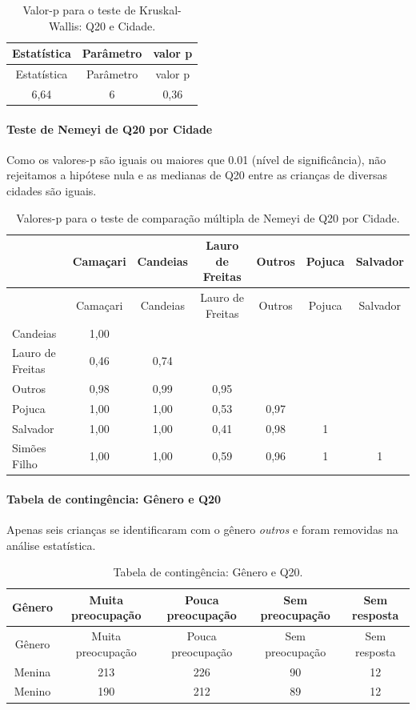 \documentclass[]{article}
\let\oldparagraph\paragraph
\renewcommand{\paragraph}[1]{\oldparagraph{#1}\mbox{}}
\begin{document}
\begin{longtable}[]{@{}ccc@{}}
\caption{\label{tab:unnamed-chunk-374}Valor-p para o teste de Kruskal-Wallis: Q20 e Cidade.}\tabularnewline
\toprule
Estatística & Parâmetro & valor p\tabularnewline
\midrule
\endfirsthead
\toprule
Estatística & Parâmetro & valor p\tabularnewline
\midrule
\endhead
6,64 & 6 & 0,36\tabularnewline
\bottomrule
\end{longtable}

\hypertarget{teste-de-nemeyi-de-q20-por-cidade}{%
\paragraph{Teste de Nemeyi de Q20 por Cidade}\label{teste-de-nemeyi-de-q20-por-cidade}}

Como os valores-p são iguais ou maiores que 0.01 (nível de significância), não rejeitamos a hipótese nula e as medianas de Q20 entre as crianças de diversas cidades são iguais.

\begin{longtable}[]{@{}lcccccc@{}}
\caption{\label{tab:unnamed-chunk-376}Valores-p para o teste de comparação múltipla de Nemeyi de Q20 por Cidade.}\tabularnewline
\toprule
& Camaçari & Candeias & Lauro de Freitas & Outros & Pojuca & Salvador\tabularnewline
\midrule
\endfirsthead
\toprule
& Camaçari & Candeias & Lauro de Freitas & Outros & Pojuca & Salvador\tabularnewline
\midrule
\endhead
Candeias & 1,00 & & & & &\tabularnewline
Lauro de Freitas & 0,46 & 0,74 & & & &\tabularnewline
Outros & 0,98 & 0,99 & 0,95 & & &\tabularnewline
Pojuca & 1,00 & 1,00 & 0,53 & 0,97 & &\tabularnewline
Salvador & 1,00 & 1,00 & 0,41 & 0,98 & 1 &\tabularnewline
Simões Filho & 1,00 & 1,00 & 0,59 & 0,96 & 1 & 1\tabularnewline
\bottomrule
\end{longtable}

\cleardoublepage

\hypertarget{tabela-de-continguxeancia-guxeanero-e-q20}{%
\paragraph{Tabela de contingência: Gênero e Q20}\label{tabela-de-continguxeancia-guxeanero-e-q20}}

Apenas seis crianças se identificaram com o gênero \emph{outros} e foram removidas na análise estatística.

\begin{longtable}[]{@{}ccccc@{}}
\caption{\label{tab:unnamed-chunk-377}Tabela de contingência: Gênero e Q20.}\tabularnewline
\toprule
Gênero & Muita preocupação & Pouca preocupação & Sem preocupação & Sem resposta\tabularnewline
\midrule
\endfirsthead
\toprule
Gênero & Muita preocupação & Pouca preocupação & Sem preocupação & Sem resposta\tabularnewline
\midrule
\endhead
Menina & 213 & 226 & 90 & 12\tabularnewline
Menino & 190 & 212 & 89 & 12\tabularnewline
\bottomrule
\end{longtable}
\end{document}

